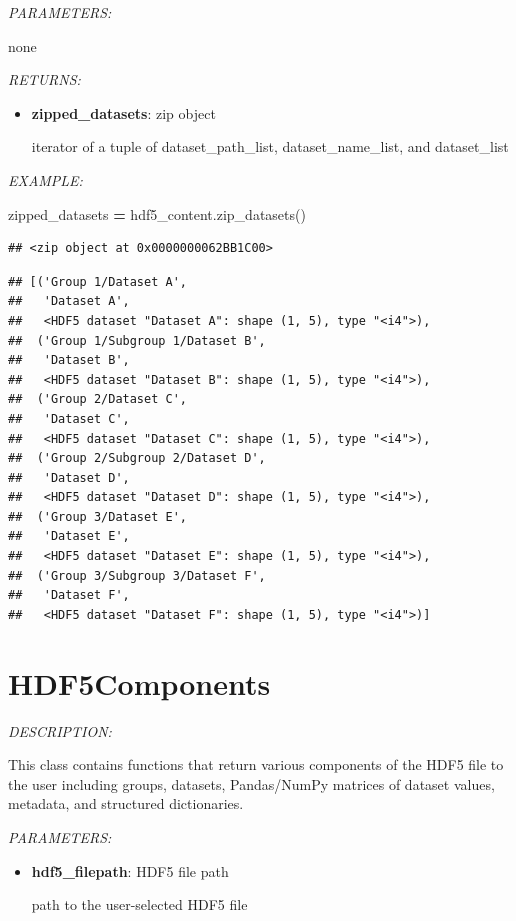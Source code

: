 \documentclass[
]{article}
\newenvironment{Shaded}{\begin{snugshade}}{\end{snugshade}}
\newcommand{\NormalTok}[1]{#1}
\newcommand{\OperatorTok}[1]{\textcolor[rgb]{0.81,0.36,0.00}{\textbf{#1}}}
\begin{document}
\emph{PARAMETERS:}

none

\emph{RETURNS:}

\begin{itemize}
\item
  \textbf{zipped\_datasets}: zip object

  iterator of a tuple of dataset\_path\_list, dataset\_name\_list, and dataset\_list
\end{itemize}

\emph{EXAMPLE:}

\begin{Shaded}
\begin{Highlighting}[]
\NormalTok{zipped_datasets }\OperatorTok{=}\NormalTok{ hdf5_content.zip_datasets()}
\end{Highlighting}
\end{Shaded}

\begin{verbatim}
## <zip object at 0x0000000062BB1C00>
\end{verbatim}

\begin{verbatim}
## [('Group 1/Dataset A',
##   'Dataset A',
##   <HDF5 dataset "Dataset A": shape (1, 5), type "<i4">),
##  ('Group 1/Subgroup 1/Dataset B',
##   'Dataset B',
##   <HDF5 dataset "Dataset B": shape (1, 5), type "<i4">),
##  ('Group 2/Dataset C',
##   'Dataset C',
##   <HDF5 dataset "Dataset C": shape (1, 5), type "<i4">),
##  ('Group 2/Subgroup 2/Dataset D',
##   'Dataset D',
##   <HDF5 dataset "Dataset D": shape (1, 5), type "<i4">),
##  ('Group 3/Dataset E',
##   'Dataset E',
##   <HDF5 dataset "Dataset E": shape (1, 5), type "<i4">),
##  ('Group 3/Subgroup 3/Dataset F',
##   'Dataset F',
##   <HDF5 dataset "Dataset F": shape (1, 5), type "<i4">)]
\end{verbatim}

\hypertarget{hdf5components}{%
\section{HDF5Components}\label{hdf5components}}

\emph{DESCRIPTION:}

This class contains functions that return various components of the HDF5 file to the user including groups, datasets, Pandas/NumPy matrices of dataset values, metadata, and structured dictionaries.

\emph{PARAMETERS:}

\begin{itemize}
\item
  \textbf{hdf5\_filepath}: HDF5 file path

  path to the user-selected HDF5 file
\end{itemize}
\end{document}
